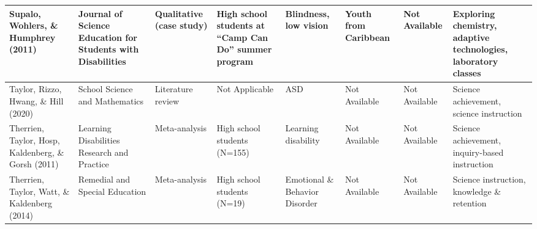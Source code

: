 \documentclass[11.5pt]{sig-alternate}
\begin{document}
\begin{@twocolumnfalse}
\begin{table}
\begin{tabular}{m{0.72in}m{0.72in}m{0.72in}m{0.72in}m{0.72in}m{0.72in}m{0.72in}m{0.72in}}
Supalo, Wohlers, \& Humphrey (2011)                     & Journal of Science Education for Students with Disabilities     & Qualitative (case study)              & High school students at “Camp Can Do” summer program                                         & Blindness, low vision                             & Youth from Caribbean                                                                                   &  \centering Not Available                                                    & Exploring chemistry, adaptive technologies, laboratory classes                                           \\ \hline
Taylor, Rizzo, Hwang, \& Hill (2020)                    & School Science and Mathematics                                  & Literature review                     &  \centering Not Applicable                                                                               & ASD                                               &  \centering Not Available                                                                                          &  \centering Not Available                                                    & Science achievement, science instruction                                                                 \\ \hline
Therrien, Taylor, Hosp, Kaldenberg, \&  Gorsh (2011) & Learning Disabilities Research and Practice                     & Meta-analysis                         & High school students (N=155)                                                                 & Learning disability                               &  \centering Not Available                                                                                          &  \centering Not Available                                                    & Science achievement, inquiry-based instruction                                                           \\ \hline
Therrien, Taylor, Watt, \& Kaldenberg (2014)            & Remedial and Special Education                                  & Meta-analysis                         & High school students (N=19)                                                                  & Emotional \& Behavior Disorder                    &  \centering Not Available                                                                                          &  \centering Not Available                                                    & Science instruction, knowledge \& retention                                                              \\ \hline

\end{tabular}
\end{table}
\end{@twocolumnfalse}
\end{document}
